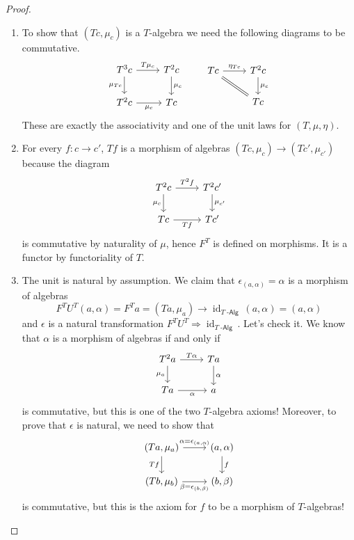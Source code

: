 \documentclass[a4paper,11pt,oneside,openany]{scrbook}
\DeclareMathOperator{\Alg}{-\mathsf{Alg}}
\DeclareMathOperator{\id}{id}
\theoremstyle{definition}
\theoremstyle{definition}
\begin{document}
\begin{proof}
	\begin{enumerate}[label=(\roman*)]
		\item To show that $(Tc, \mu_c)$ is a $T$-algebra we need the following diagrams to be commutative.
		\[
		\begin{tikzcd}
		T^3c\ar["\mu_{Tc}"', rightarrow]{d}\ar["T\mu_c", rightarrow]{r}
		& T^2c\ar["\mu_c", rightarrow]{d} \\
		T^2c\ar["\mu_c"', rightarrow]{r}
		& Tc
		\end{tikzcd}
		\quad\quad
		\begin{tikzcd}
		Tc\ar["\eta_{Tc}",rightarrow]{r}\ar[equal]{dr}
		& T^2c\ar["\mu_c", rightarrow]{d}
		\\
		& Tc
		\end{tikzcd}
		\]
		These are exactly the associativity and one of the unit laws for $(T, \mu, \eta)$.
	\item For every $f\colon c\to c'$, $Tf$ is a morphism of algebras $(Tc,\mu_c)\to(Tc', \mu_{c'})$ because the diagram 
		\[
	\begin{tikzcd}
	T^2c\ar["\mu_{c}"', rightarrow]{d}\ar["T^2f", rightarrow]{r}
	& T^2c'\ar["\mu_{c'}", rightarrow]{d} \\
	Tc\ar["Tf"', rightarrow]{r}
	& Tc'
	\end{tikzcd}
		\]
	is commutative by naturality of $\mu$, hence $F^T$ is defined on morphisms. It is a functor by functoriality of $T$.
	\item The unit is natural by assumption. We claim that $\epsilon_{(a,\alpha)}=\alpha$ is a morphism of algebras $$F^TU^T(a,\alpha)=F^Ta=(Ta,\mu_a) \to \id_{T\Alg}(a,\alpha)=(a,\alpha)$$ and $\epsilon$ is a natural transformation $F^TU^T\Rightarrow\id_{T\Alg}$. Let's check it. We know that $\alpha$ is a morphism of algebras if and only if 
	\[	
	\begin{tikzcd}
	T^2 a\ar["\mu_{a}"']{d}\ar["T\alpha"]{r}
	& Ta\ar["\alpha"]{d} \\
	Ta\ar["\alpha"']{r}
	& a
	\end{tikzcd}
	\]
	is commutative, but this is one of the two $T$-algebra axioms! Moreover, to prove that $\epsilon$ is natural, we need to show that
		\[	
	\begin{tikzcd}
	(Ta,\mu_a) \ar["Tf"']{d}\ar["\alpha=\epsilon_{(a,\alpha)}"]{r}
	& (a,\alpha)\ar["f"]{d} \\
	(Tb,\mu_b)\ar["\beta=\epsilon_{(b,\beta)}"']{r}
	& (b,\beta)
	\end{tikzcd}
	\]
	is commutative, but this is the axiom for $f$ to be a morphism of $T$-algebras! 

\end{enumerate}
\end{proof}
\end{document}
